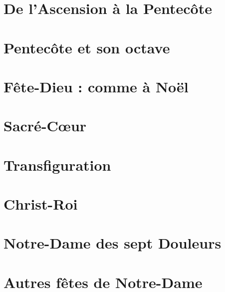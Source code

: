 \documentclass[%
a6paper%
,fontsize=8pt%
,DIV=13%
,titlepage=on%
,headings=optiontoheadandtoc%
,headings=small%
,parskip=false%
]{scrbook}
\begin{document}

\section{De l'Ascension à la Pentecôte}\paginarectavacua


\section{Pentecôte et son octave}\paginarectavacua


\section*{Fête-Dieu : comme à Noël}\paginarectavacua

\section{Sacré-Cœur}\paginarectavacua


\section{Transfiguration}\paginarectavacua


\section{Christ-Roi}\paginarectavacua


\section{Notre-Dame des sept Douleurs}\paginarectavacua


\section[Fêtes de la sainte Vierge]{Autres fêtes de Notre-Dame}\paginarectavacua

\end{document}
